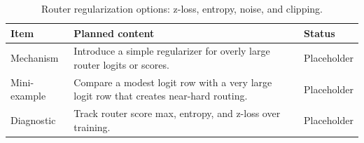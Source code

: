\begin{table}[H]
\centering
\caption{Router regularization options: z-loss, entropy, noise, and clipping.}
\label{tab:ch07-router-score-scale-and-z-loss}
\begin{tabularx}{\textwidth}{p{}X p{}}
\toprule
Item & Planned content & Status \\
\midrule
Mechanism & Introduce a simple regularizer for overly large router logits or scores. & Placeholder \\
Mini-example & Compare a modest logit row with a very large logit row that creates near-hard routing. & Placeholder \\
Diagnostic & Track router score max, entropy, and z-loss over training. & Placeholder \\
\bottomrule
\end{tabularx}
\end{table}
